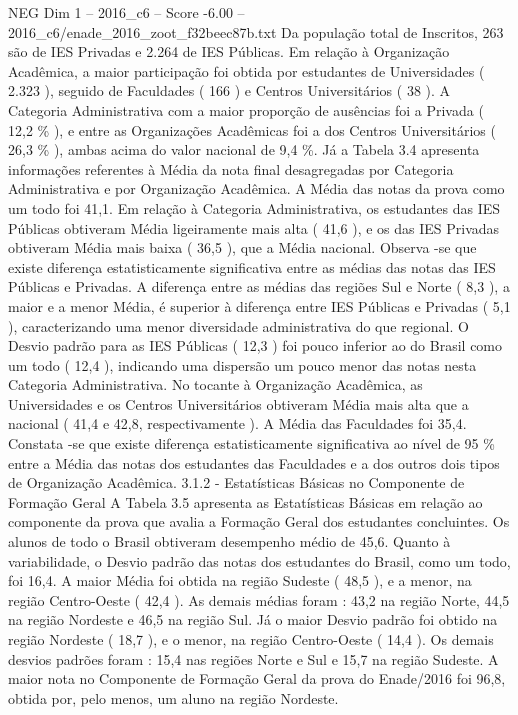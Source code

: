 \begin{textsample}{NEG Dim 1 – 2016\_c6 – Score -6.00 – 2016\_c6/enade\_2016\_zoot\_f32beec87b.txt}
Da população total de Inscritos, 263 são de IES Privadas e 2.264 de IES Públicas.
Em relação à Organização Acadêmica, a maior participação foi obtida por estudantes de Universidades ( 2.323 ), seguido de Faculdades ( 166 ) e Centros Universitários ( 38 ).
A Categoria Administrativa com a maior proporção de ausências foi a Privada ( 12,2 \% ), e entre as Organizações Acadêmicas foi a dos Centros Universitários ( 26,3 \% ), ambas acima do valor nacional de 9,4 \%.
Já a Tabela 3.4 apresenta informações referentes à Média da nota final desagregadas por Categoria Administrativa e por Organização Acadêmica.
A Média das notas da prova como um todo foi 41,1.
Em relação à Categoria Administrativa, os estudantes das IES Públicas obtiveram Média ligeiramente mais alta ( 41,6 ), e os das IES Privadas obtiveram Média mais baixa ( 36,5 ), que a Média nacional.
Observa -se que existe diferença estatisticamente significativa entre as médias das notas das IES Públicas e Privadas.
A diferença entre as médias das regiões Sul e Norte ( 8,3 ), a maior e a menor Média, é superior à diferença entre IES Públicas e Privadas ( 5,1 ), caracterizando uma menor diversidade administrativa do que regional.
O Desvio padrão para as IES Públicas ( 12,3 ) foi pouco inferior ao do Brasil como um todo ( 12,4 ), indicando uma dispersão um pouco menor das notas nesta Categoria Administrativa.
No tocante à Organização Acadêmica, as Universidades e os Centros Universitários obtiveram Média mais alta que a nacional ( 41,4 e 42,8, respectivamente ).
A Média das Faculdades foi 35,4.
Constata -se que existe diferença estatisticamente significativa ao nível de 95 \% entre a Média das notas dos estudantes das Faculdades e a dos outros dois tipos de Organização Acadêmica. 3.1.2 - Estatísticas Básicas no Componente de Formação Geral A Tabela 3.5 apresenta as Estatísticas Básicas em relação ao componente da prova que avalia a Formação Geral dos estudantes concluintes.
Os alunos de todo o Brasil obtiveram desempenho médio de 45,6.
Quanto à variabilidade, o Desvio padrão das notas dos estudantes do Brasil, como um todo, foi 16,4.
A maior Média foi obtida na região Sudeste ( 48,5 ), e a menor, na região Centro-Oeste ( 42,4 ).
As demais médias foram : 43,2 na região Norte, 44,5 na região Nordeste e 46,5 na região Sul.
Já o maior Desvio padrão foi obtido na região Nordeste ( 18,7 ), e o menor, na região Centro-Oeste ( 14,4 ).
Os demais desvios padrões foram : 15,4 nas regiões Norte e Sul e 15,7 na região Sudeste.
A maior nota no Componente de Formação Geral da prova do Enade/2016 foi 96,8, obtida por, pelo menos, um aluno na região Nordeste.

\end{textsample}
